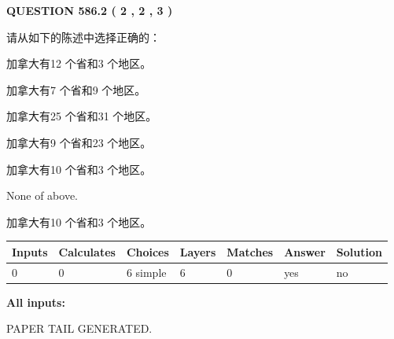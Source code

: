 \documentclass{ctexart}
\begin{document}
   
  
\vspace{0.2in}
  
{\textbf{\Large{QUESTION
586.2 
 ( 2 , 2 , 3 )
}}}
  
  
请从如下的陈述中选择正确的：
 
 
加拿大有12 个省和3 个地区。
 
 
加拿大有7 个省和9 个地区。
 
 
加拿大有25 个省和31 个地区。
 
 
加拿大有9 个省和23 个地区。
 
 
加拿大有10 个省和3 个地区。
 
 
 None of above.
 
 
\noindent{}
 
 
加拿大有10 个省和3 个地区。
 
 
\noindent{}
 
 
   
   
   
   
\noindent\begin{tabular}{|l|l|l|l|l|l|l|}
 \hline
Inputs & Calculates & Choices & Layers & Matches & Answer & Solution \\ \hline
 0  & 
 0  & 
 6
  simple  
  & 
 6  & 
 0  & 
  yes & 
  no 
  \\ \hline
 \end{tabular}
   
   
   
   
\noindent{}
   
   
   
   
\noindent\vspace{0.1in}\hspace{-0.08in} {\textbf{\Large{All inputs: }}}
   
   
   
   
   
   
 \vspace{0.2in}
 
   
   
\vspace{2.0in} PAPER TAIL GENERATED.
   
\end{document}
